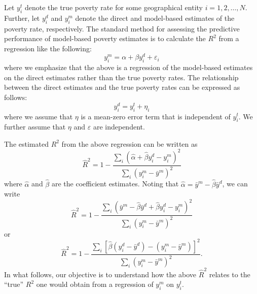 \documentclass[english]{article}
\begin{document}
\doublespacing



Let $y_i^t$ denote the true poverty rate for some geographical entity $i = 1, 2, \ldots, N$.
Further, let $y_i^d$ and $y_i^m$ denote the direct and model-based estimates of the poverty rate, 
respectively.
The standard method for assessing the predictive performance of model-based poverty estimates is
to calculate the $R^2$ from a regression like the following:
\begin{equation}
y_i^m = \alpha + \beta y_i^d + \varepsilon_i
\label{eq:reg}
\end{equation}
where we emphasize that the above is a regression of the model-based estimates on the direct
estimates rather than the true poverty rates.
The relationship between the direct estimates and the true poverty rates can be expressed as follows:
\begin{equation}
y_i^d = y_i^t + \eta_i
\end{equation}
where we assume that $\eta$ is a mean-zero error term that is independent of $y_i^t$.
We further assume that $\eta$ and $\varepsilon$ are independent.

The estimated $R^2$ from the above regression can be written as
\begin{equation}
\hat{R}^2 = 1 - \frac{\sum_i(\hat{\alpha} + \hat{\beta}y_i^d - y_i^m)^2}{\sum_i (y_i^m - \bar{y}^m)^2}
\end{equation}
where $\hat{\alpha}$ and $\hat{\beta}$ are the coefficient estimates.
Noting that $\hat{\alpha} = \bar{y}^m - \hat{\beta}\bar{y}^d$, we can write
\begin{equation}
\hat{R}^2 = 1 - \frac{\sum_i(\bar{y}^m - \hat{\beta}\bar{y}^d + \hat{\beta}y_i^d - 
y_i^m)^2}{\sum_i (y_i^m - \bar{y}^m)^2}
\end{equation}
or 
\begin{equation}
\hat{R}^2 = 1 - \frac{\sum_i\left[\hat{\beta}(y_i^d  - \bar{y}^d) - (y_i^m - \bar{y}^m)
 \right]^2}{\sum_i (y_i^m - \bar{y}^m)^2}.
\end{equation}
In what follows, our objective is to understand how the above $\hat{R}^2$ relates to the ``true'' $R^2$ 
one would obtain from a regression of $y_i^m$ on $y_i^t$.
\end{document}
